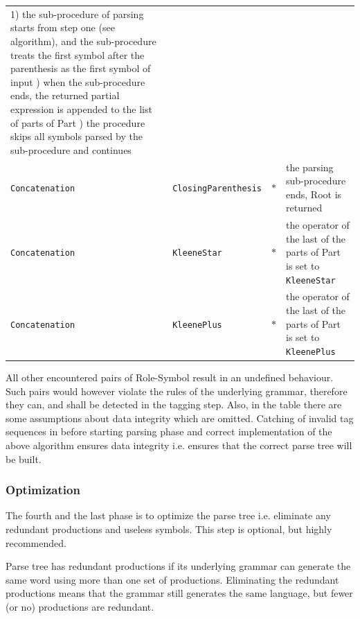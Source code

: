 \documentclass{article}
\begin{document}
\begin{tabularx}{\textwidth}{l|l|l|X}
1) the sub-procedure of parsing starts from step one (see algorithm), and the sub-procedure treats the first
symbol after the parenthesis as the first symbol of input \newline
2) when the sub-procedure ends, the returned partial expression is appended to the list of parts of Part \newline
3) the procedure skips all symbols parsed by the sub-procedure and continues \\

\verb|Concatenation| & \verb|ClosingParenthesis| & $*$ &

the parsing sub-procedure ends, Root is returned \\

\verb|Concatenation| & \verb|KleeneStar| & $*$ &

the operator of the last of the parts of Part is set to \verb|KleeneStar| \\

\verb|Concatenation| & \verb|KleenePlus| & $*$ &

the operator of the last of the parts of Part is set to \verb|KleenePlus| \\

\end{tabularx}

\vspace{10pt} All other encountered pairs of Role-Symbol result in an undefined behaviour. Such pairs would
however violate the rules of the underlying grammar, therefore they can, and shall be detected in
the tagging step. Also, in the table there are some assumptions about data integrity which are
omitted. Catching of invalid tag sequences in before starting parsing phase and correct
implementation of the above algorithm ensures data integrity i.e. ensures that the correct parse
tree will be built.

\subsubsection{Optimization}
The fourth and the last phase is to optimize the parse tree i.e. eliminate any redundant productions
and useless symbols. This step is optional, but highly recommended.

Parse tree has redundant productions if its underlying grammar can generate the same word using more
than one set of productions. Eliminating the redundant productions means that the grammar still
generates the same language, but fewer (or no) productions are redundant.
\end{document}
